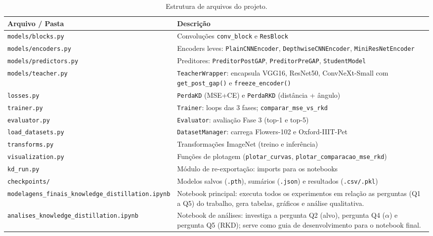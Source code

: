 \documentclass[
  article,            %
  11pt,               %
  letterpaper,        %
  oneside,            %
  sumario = tradicional
]{abntex2}
\begin{document}
\begin{table}[htb]
\centering
\caption{Estrutura de arquivos do projeto.}
\label{tab:repo}
\begin{tabularx}{\linewidth}{@{}lX@{}}
\toprule
\textbf{Arquivo / Pasta} & \textbf{Descrição} \\ \midrule
\texttt{models/blocks.py}      & Convoluções \texttt{conv\_block} e \texttt{ResBlock} \\
\texttt{models/encoders.py}    & Encoders leves: \texttt{PlainCNNEncoder}, \texttt{DepthwiseCNNEncoder}, \texttt{MiniResNetEncoder} \\
\texttt{models/predictors.py}  & Preditores: \texttt{PreditorPostGAP}, \texttt{PreditorPreGAP}, \texttt{StudentModel} \\
\texttt{models/teacher.py}     & \texttt{TeacherWrapper}: encapsula VGG16, ResNet50, ConvNeXt-Small com \texttt{get\_post\_gap()} e \texttt{freeze\_encoder()} \\
\texttt{losses.py}             & \texttt{PerdaKD} (MSE+CE) e \texttt{PerdaRKD} (distância + ângulo) \\
\texttt{trainer.py}            & \texttt{Trainer}: loops das 3 fases; \texttt{comparar\_mse\_vs\_rkd} \\
\texttt{evaluator.py}          & \texttt{Evaluator}: avaliação Fase 3 (top-1 e top-5) \\
\texttt{load\_datasets.py}     & \texttt{DatasetManager}: carrega Flowers-102 e Oxford-IIIT-Pet \\
\texttt{transforms.py}         & Transformações ImageNet (treino e inferência) \\
\texttt{visualization.py}      & Funções de plotagem (\texttt{plotar\_curvas}, \texttt{plotar\_comparacao\_mse\_rkd}) \\
\texttt{kd\_run.py}            & Módulo de re-exportação: imports para os notebooks \\
\texttt{checkpoints/}          & Modelos salvos (\texttt{.pth}), sumários (\texttt{.json}) e resultados (\texttt{.csv/.pkl}) \\ \midrule
\texttt{modelagens\_finais\_knowledge\_distillation.ipynb} & Notebook principal: executa todos os experimentos em relação as perguntas (Q1 a Q5) do trabalho, gera tabelas, gráficos e análise qualitativa. \\
\texttt{analises\_knowledge\_distillation.ipynb} & Notebook de análises: investiga a pergunta Q2 (alvo), pergunta Q4 ($\alpha$) e pergunta Q5 (RKD); serve como guia de desenvolvimento para o notebook final. \\
\bottomrule
\end{tabularx}
\end{table}
\end{document}
